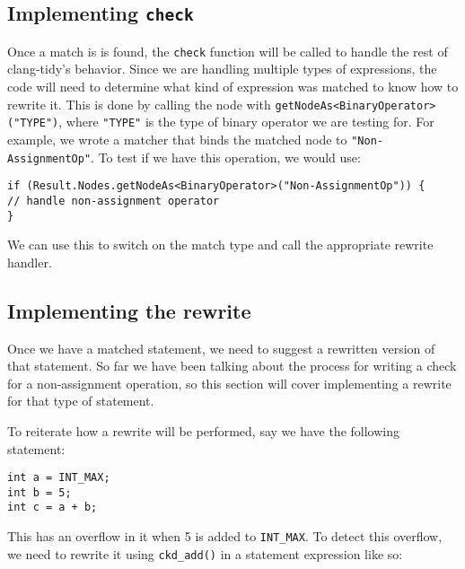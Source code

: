 \subsection{Implementing \texttt{check}}
Once a match is is found, the \texttt{check} function will be called to handle the rest of clang-tidy's behavior. Since we are handling multiple types of expressions, the code will need to determine what kind of expression was matched to know how to rewrite it. This is done by calling the node with \texttt{getNodeAs<BinaryOperator>("TYPE")}, where \texttt{"TYPE"} is the type of binary operator we are testing for. For example, we wrote a matcher that binds the matched node to \texttt{"Non-AssignmentOp"}. To test if we have this operation, we would use:
\begin{center}
\parbox{0.9\linewidth}{
\texttt{if (Result.Nodes.getNodeAs<BinaryOperator>("Non-AssignmentOp")) \{\\
\hspace*{2em}// handle non-assignment operator\\
\}}
}
\end{center}

We can use this to switch on the match type and call the appropriate rewrite handler.

\subsection{Implementing the rewrite}

Once we have a matched statement, we need to suggest a rewritten version of that statement. So far we have been talking about the process for writing a check for a non-assignment operation, so this section will cover implementing a rewrite for that type of statement.

To reiterate how a rewrite will be performed, say we have the following statement:
\begin{center}
\parbox{0.9\linewidth}{
\texttt{int a = INT\_MAX;\\
int b = 5;\\
int c = a + b;}
}
\end{center}

This has an overflow in it when 5 is added to \texttt{INT\_MAX}. To detect this overflow, we need to rewrite it using \texttt{ckd\_add()} in a statement expression like so:


